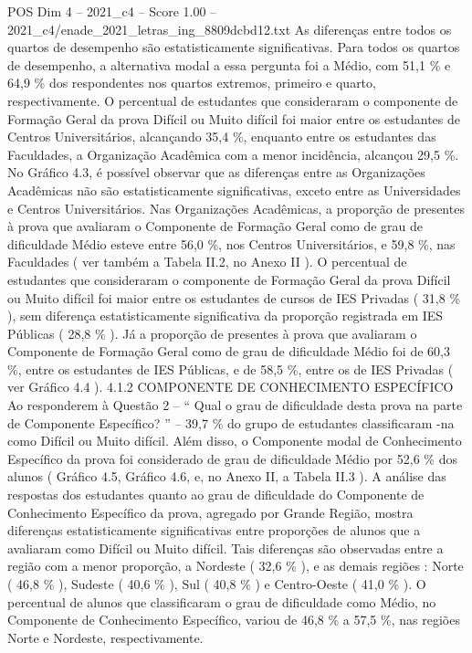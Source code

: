 \begin{textsample}{POS Dim 4 – 2021\_c4 – Score 1.00 – 2021\_c4/enade\_2021\_letras\_ing\_8809dcbd12.txt}
As diferenças entre todos os quartos de desempenho são estatisticamente significativas.
Para todos os quartos de desempenho, a alternativa modal a essa pergunta foi a Médio, com 51,1 \% e 64,9 \% dos respondentes nos quartos extremos, primeiro e quarto, respectivamente.
O percentual de estudantes que consideraram o componente de Formação Geral da prova Difícil ou Muito difícil foi maior entre os estudantes de Centros Universitários, alcançando 35,4 \%, enquanto entre os estudantes das Faculdades, a Organização Acadêmica com a menor incidência, alcançou 29,5 \%.
No Gráfico 4.3, é possível observar que as diferenças entre as Organizações Acadêmicas não são estatisticamente significativas, exceto entre as Universidades e Centros Universitários.
Nas Organizações Acadêmicas, a proporção de presentes à prova que avaliaram o Componente de Formação Geral como de grau de dificuldade Médio esteve entre 56,0 \%, nos Centros Universitários, e 59,8 \%, nas Faculdades ( ver também a Tabela II.2, no Anexo II ).
O percentual de estudantes que consideraram o componente de Formação Geral da prova Difícil ou Muito difícil foi maior entre os estudantes de cursos de IES Privadas ( 31,8 \% ), sem diferença estatisticamente significativa da proporção registrada em IES Públicas ( 28,8 \% ).
Já a proporção de presentes à prova que avaliaram o Componente de Formação Geral como de grau de dificuldade Médio foi de 60,3 \%, entre os estudantes de IES Públicas, e de 58,5 \%, entre os de IES Privadas ( ver Gráfico 4.4 ). 4.1.2 COMPONENTE DE CONHECIMENTO ESPECÍFICO Ao responderem à Questão 2 – “ Qual o grau de dificuldade desta prova na parte de Componente Específico? ” – 39,7 \% do grupo de estudantes classificaram -na como Difícil ou Muito difícil.
Além disso, o Componente modal de Conhecimento Específico da prova foi considerado de grau de dificuldade Médio por 52,6 \% dos alunos ( Gráfico 4.5, Gráfico 4.6, e, no Anexo II, a Tabela II.3 ).
A análise das respostas dos estudantes quanto ao grau de dificuldade do Componente de Conhecimento Específico da prova, agregado por Grande Região, mostra diferenças estatisticamente significativas entre proporções de alunos que a avaliaram como Difícil ou Muito difícil.
Tais diferenças são observadas entre a região com a menor proporção, a Nordeste ( 32,6 \% ), e as demais regiões : Norte ( 46,8 \% ), Sudeste ( 40,6 \% ), Sul ( 40,8 \% ) e Centro-Oeste ( 41,0 \% ).
O percentual de alunos que classificaram o grau de dificuldade como Médio, no Componente de Conhecimento Específico, variou de 46,8 \% a 57,5 \%, nas regiões Norte e Nordeste, respectivamente.

\end{textsample}
